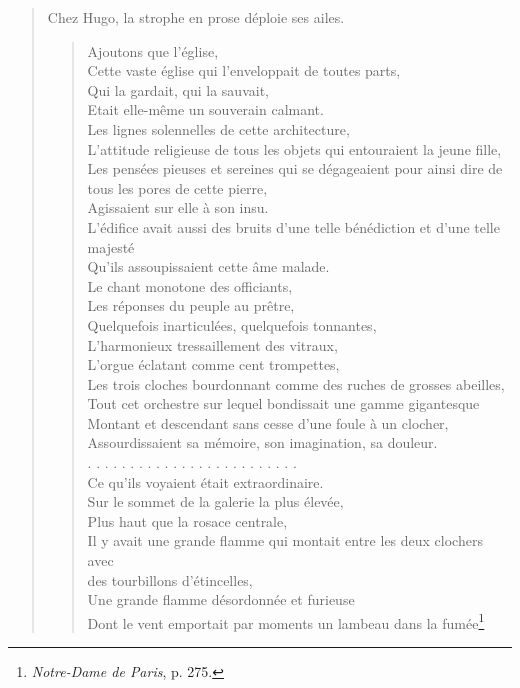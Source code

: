 \documentclass[french,twoside]{book} %
\begin{document}
\begin{verse}
\noindent Chez Hugo, la strophe en prose déploie ses ailes.\par


\begin{verse}
 Ajoutons que l’église,\\
Cette vaste église qui l’enveloppait de toutes parts,\\
 Qui la gardait, qui la sauvait,\\
Etait elle-même un souverain calmant.\\
Les lignes solennelles de cette architecture,\\
L’attitude religieuse de tous les objets qui entouraient la jeune fille,\\
Les pensées pieuses et sereines qui se dégageaient pour ainsi dire de tous les pores de cette pierre,\\
 Agissaient sur elle à son insu.\\
L’édifice avait aussi des bruits d’une telle bénédiction et d’une telle majesté\\
 Qu’ils assoupissaient cette âme malade.\\
 Le chant monotone des officiants,\\
Les réponses du peuple au prêtre,\\
Quelquefois inarticulées, quelquefois tonnantes,\\
L’harmonieux tressaillement des vitraux,\\
L’orgue éclatant comme cent trompettes,\\
Les trois cloches bourdonnant comme des ruches de grosses abeilles,\\
Tout cet orchestre sur lequel bondissait une gamme gigantesque\\
Montant et descendant sans cesse d’une foule à un clocher,\\
Assourdissaient sa mémoire, son imagination, sa douleur.\\
. . . . . . . . . . . . . . . . . . . . . . . . .\\
Ce qu’ils voyaient était extraordinaire.\\
Sur le sommet de la galerie la plus élevée,\\
Plus haut que la rosace centrale,\\
Il y avait une grande flamme qui montait entre les deux clochers avec\\
des tourbillons d’étincelles,\\
Une grande flamme désordonnée et furieuse\\
Dont le vent emportait par moments un lambeau dans la fumée\footnote{\emph{Notre-Dame de Paris}, p. 275.}\\
\end{verse}


\end{verse}
\end{document}
